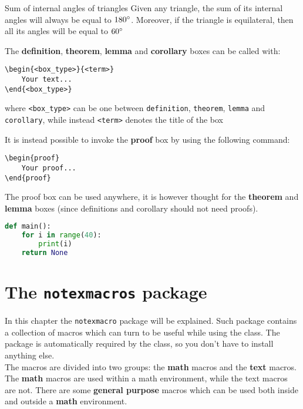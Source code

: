 \documentclass[]{notex}
\begin{document}
\begin{corollary}{Sum of internal angles of triangles}
    Given any triangle, the sum of its internal angles will always be equal to $180\degree$. Moreover, if the triangle is equilateral, then all its angles will be equal to $60\degree$
\end{corollary}
\medskip
\noindent The \textbf{definition}, \textbf{theorem}, \textbf{lemma} and \textbf{corollary} boxes can be called with:
\begin{tcolorbox}
    \begin{verbatim}
\begin{<box_type>}{<term>}
    Your text...
\end{<box_type>}\end{verbatim}

\noindent where \verb|<box_type>| can be one between \texttt{definition}, \texttt{theorem}, \texttt{lemma} and \texttt{corollary}, while instead \verb|<term>| denotes the title of the box
\end{tcolorbox}

\noindent It is instead possible to invoke the \textbf{proof} box by using the following command:

\begin{tcolorbox}
    \begin{verbatim}
\begin{proof}
    Your proof...
\end{proof}\end{verbatim}
\end{tcolorbox}

\noindent The proof box can be used anywhere, it is however thought for the \textbf{theorem} and \textbf{lemma} boxes (since definitions and corollary should not need proofs).

\begin{codeblock}
    \begin{lstlisting}[language = Python]
def main():
    for i in range(40):
        print(i)
    return None\end{lstlisting}
\end{codeblock}


\chapter{The \texttt{notexmacros} package}

\noindent In this chapter the \texttt{notexmacro} package will be explained. Such package contains a collection of macros which can turn to be useful while using the class. The package is automatically required by the class, so you don't have to install anything else.
\\
\indent The macros are divided into two groups: the \textbf{math} macros and the \textbf{text} macros. The \textbf{math} macros are used within a math environment, while the text macros are not. There are some \textbf{general purpose} macros which can be used both inside and outside a \textbf{math} environment.
\end{document}
